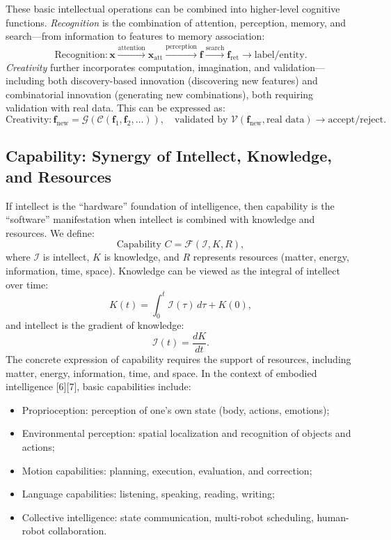 \documentclass[12pt,a4paper]{article}
\begin{document}
These basic intellectual operations can be combined into higher-level cognitive functions. \emph{Recognition} is the combination of attention, perception, memory, and search—from information to features to memory association:
\[
\text{Recognition}: \mathbf{x} \xrightarrow{\text{attention}} \mathbf{x}_{\text{att}} \xrightarrow{\text{perception}} \mathbf{f} \xrightarrow{\text{search}} \mathbf{f}_{\text{ret}} \to \text{label/entity}.
\]
\emph{Creativity} further incorporates computation, imagination, and validation—including both discovery-based innovation (discovering new features) and combinatorial innovation (generating new combinations), both requiring validation with real data. This can be expressed as:
\[
\text{Creativity}: \mathbf{f}_{\text{new}} = \mathcal{G}(\mathcal{C}(\mathbf{f}_1,\mathbf{f}_2,\dots)), \quad \text{validated by } \mathcal{V}(\mathbf{f}_{\text{new}}, \text{real data}) \to \text{accept/reject}.
\]

\subsection{Capability: Synergy of Intellect, Knowledge, and Resources}
If intellect is the “hardware” foundation of intelligence, then capability is the “software” manifestation when intellect is combined with knowledge and resources. We define:
\[
\text{Capability } C = \mathcal{F}(\mathcal{I}, K, R),
\]
where $\mathcal{I}$ is intellect, $K$ is knowledge, and $R$ represents resources (matter, energy, information, time, space). Knowledge can be viewed as the integral of intellect over time:
\[
K(t) = \int_{0}^{t} \mathcal{I}(\tau) \, d\tau + K(0),
\]
and intellect is the gradient of knowledge:
\[
\mathcal{I}(t) = \frac{dK}{dt}.
\]
The concrete expression of capability requires the support of resources, including matter, energy, information, time, and space. In the context of embodied intelligence [6][7], basic capabilities include:

\begin{itemize}
\item Proprioception: perception of one’s own state (body, actions, emotions);
\item Environmental perception: spatial localization and recognition of objects and actions;
\item Motion capabilities: planning, execution, evaluation, and correction;
\item Language capabilities: listening, speaking, reading, writing;
\item Collective intelligence: state communication, multi-robot scheduling, human-robot collaboration.
\end{itemize}
\end{document}
